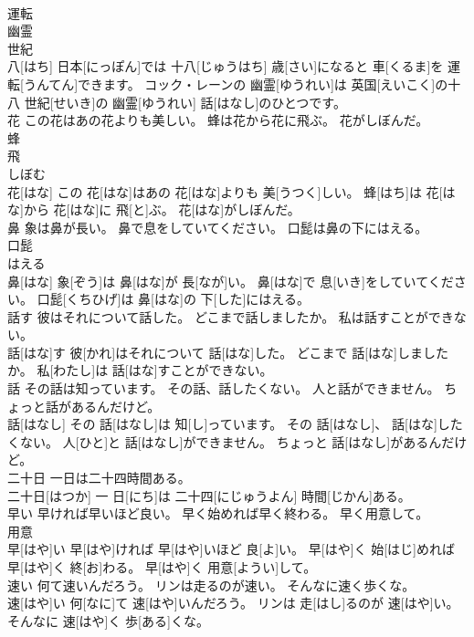 \documentclass[8pt]{extreport}
\begin{document}
\begin{CJK}{UTF8}{min}
\\	運転 
\\	幽霊 
\\	世紀 
\\	八[はち] 日本[にっぽん]では 十八[じゅうはち] 歳[さい]になると 車[くるま]を 運転[うんてん]できます。 コック・レーンの 幽霊[ゆうれい]は 英国[えいこく]の十八 世紀[せいき]の 幽霊[ゆうれい] 話[はなし]のひとつです。
\\	花 この花はあの花よりも美しい。 蜂は花から花に飛ぶ。 花がしぼんだ。	
\\	蜂 
\\	飛 
\\	しぼむ 
\\	花[はな] この 花[はな]はあの 花[はな]よりも 美[うつく]しい。 蜂[はち]は 花[はな]から 花[はな]に 飛[と]ぶ。 花[はな]がしぼんだ。
\\	鼻 象は鼻が長い。 鼻で息をしていてください。 口髭は鼻の下にはえる。	
\\	口髭 
\\	はえる 
\\	鼻[はな] 象[ぞう]は 鼻[はな]が 長[なが]い。 鼻[はな]で 息[いき]をしていてください。 口髭[くちひげ]は 鼻[はな]の 下[した]にはえる。
\\	話す 彼はそれについて話した。 どこまで話しましたか。 私は話すことができない。	
\\	話[はな]す 彼[かれ]はそれについて 話[はな]した。 どこまで 話[はな]しましたか。 私[わたし]は 話[はな]すことができない。
\\	話 その話は知っています。 その話、話したくない。 人と話ができません。 ちょっと話があるんだけど。	
\\	話[はなし] その 話[はなし]は 知[し]っています。 その 話[はなし]、 話[はな]したくない。 人[ひと]と 話[はなし]ができません。 ちょっと 話[はなし]があるんだけど。
\\	二十日 一日は二十四時間ある。	
\\	二十日[はつか] 一 日[にち]は 二十四[にじゅうよん] 時間[じかん]ある。
\\	早い 早ければ早いほど良い。 早く始めれば早く終わる。 早く用意して。	
\\	用意 
\\	早[はや]い 早[はや]ければ 早[はや]いほど 良[よ]い。 早[はや]く 始[はじ]めれば 早[はや]く 終[お]わる。 早[はや]く 用意[ようい]して。
\\	速い 何て速いんだろう。 リンは走るのが速い。 そんなに速く歩くな。	
\\	速[はや]い 何[なに]て 速[はや]いんだろう。 リンは 走[はし]るのが 速[はや]い。 そんなに 速[はや]く 歩[ある]くな。

\end{CJK}
\end{document}
